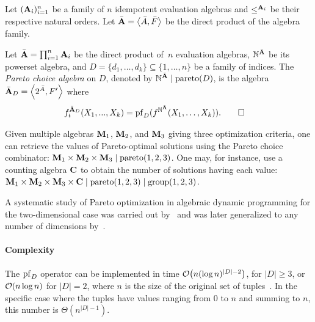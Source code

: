 \begin{definition}
    Let \((\mathbf{A}_i)_{i=1}^n\) be a family of \(n\) idempotent evaluation algebras and \(\le^{\mathbf{A}_i}\) be their respective natural orders.
    Let \(\bar{\mathbf{A}} = \left\langle\bar A, \bar F\right\rangle\) be the direct product of the algebra family.

    Let \(\bar{\mathbf{A}} = \prod_{i=1}^n \mathbf{A}_i\) be the direct product of~\(n\) evaluation algebras,
    \(\mathbb{N}^{\bar{\mathbf{A}}}\) be its powerset algebra,
    and \(D = \{d_1, \ldots, d_k\} \subseteq \{1, \ldots, n\}\) be a family of indices.
    The \emph{Pareto choice algebra} on \(D\),
    denoted by \(\mathbb{N}^{\bar{\mathbf{A}}} \mid \mathrm{pareto}(D)\),
    is the algebra \(\bar{\mathbf{A}}_D = \left\langle2^{\bar A}, F'\right\rangle\)
    where
    \begin{align*}
        f^{\bar{\mathbf{A}}_D}_t(X_1, ..., X_k)
        &= \operatorname{pf}_D(f^{\mathbb{N}^{\bar{\mathbf{A}}}}(X_1, \ldots, X_k)).
        \qedhere
    \end{align*}
\end{definition}

\begin{example}
    Given multiple algebras \(\mathbf{M}_1\), \(\mathbf{M}_2\), and \(\mathbf{M}_3\) giving three optimization criteria, one can retrieve the values of Pareto-optimal solutions using the Pareto choice combinator:
    \(\mathbf{M}_1 \times \mathbf{M}_2 \times \mathbf{M}_3 \mid \mathrm{pareto}(1, 2, 3)\).
    One may, for instance, use a counting algebra \(\mathbf{C}\) to obtain the number of solutions having each value:
    \(\mathbf{M}_1 \times \mathbf{M}_2 \times \mathbf{M}_3 \times \mathbf{C} \mid \mathrm{pareto}(1,2,3) \mid \mathrm{group}(1,2,3)\).
\end{example}

A systematic study of Pareto optimization in algebraic dynamic programming for the two-dimensional case was carried out by~\textcite{Saule2015ParetoOptimizationAlgebraic} and was later generalized to any number of dimensions by~\textcite{Gatter2016IntegratingParetoOptimization}.


\paragraph{Complexity} The \(\operatorname{pf}_D\) operator can be implemented in time \(\operatorname{\mathcal{O}}\!\left(n(\log n)^{|D|-2}\right)\), for \(|D| \ge 3\), or \(\operatorname{\mathcal{O}}(n\log n)\) for \(|D| = 2\), where \(n\) is the size of the original set of tuples~\parencite{Kung1975FindingMaximaSet}.
In the specific case where the tuples have values ranging from \(0\) to \(n\) and summing to \(n\), this number is \(\Theta(n^{|D|-1})\).

